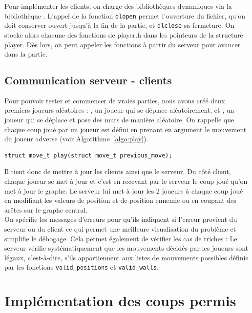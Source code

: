 \documentclass[a4paper]{article}
\begin{document}
Pour implémenter les clients, on charge des bibliothèques dynamiques via la bibliothèque . L'appel de la fonction \texttt{dlopen} permet l'ouverture du fichier, qu'on doit conserver ouvert jusqu'à la fin de la partie, et \texttt{dlclose} sa fermeture. On stocke alors chacune des fonctions de player.h dans les pointeurs de la structure player. Dès lors, on peut appeler les fonctions à partir du serveur pour avancer dans la partie. \\

\subsection{Communication serveur - clients}

Pour pouvoir tester et commencer de vraies parties, nous avons créé deux premiers joueurs aléatoires : , un joueur qui se déplace aléatoirement, et , un joueur qui se déplace et pose des murs de manière aléatoire. On rappelle que chaque coup joué par un joueur est défini en prenant en argument le mouvement du joueur adverse (voir Algorithme~\ref{algo:play}). \\
\begin{lstlisting}[caption = {Spécification de la fonction \texttt{play}}, label = {algo:play}, float = h]
struct move_t play(struct move_t previous_move); 
\end{lstlisting}

Il tient donc de mettre à jour les clients ainsi que le serveur. Du côté client, chaque joueur se met à jour et c'est en recevant par le serveur le coup joué qu'on met à jour le graphe. Le serveur lui met à jour les 2 joueurs à chaque coup joué en modifiant les valeurs de position et de position ennemie ou en coupant des arêtes sur le graphe central. \\

On spécifie les messages d'erreurs pour qu'ils indiquent si l'erreur provient du serveur ou du client ce qui permet une meilleure visualisation du problème et simplifie le débogage. Cela permet également de vérifier les cas de triches :
Le serveur vérifie systématiquement que les mouvements décidés par les joueurs sont légaux, c'est-à-dire, s'ils appartiennent aux listes de mouvements possibles définis par les fonctions \texttt{valid\_positions} et \texttt{valid\_walls}.

\section{Implémentation des coups permis}
\end{document}
